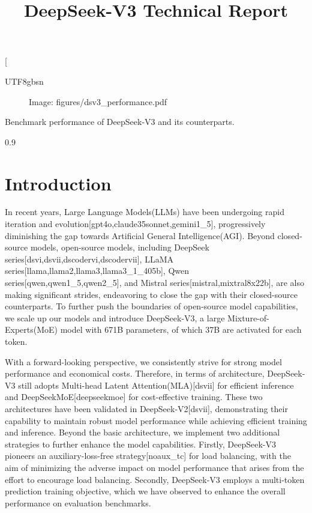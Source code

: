 \documentclass[11pt,a4paper]{article}
\title{DeepSeek-V3 Technical Report}
\begin{document}
\maketitle

[

UTF8gbsn

\begin{figure}[h]
\caption{Image: figures/dsv3\_performance.pdf}
\end{figure}

Benchmark performance of DeepSeek-V3 and its counterparts.

0.9

\section{Introduction}

In recent years, Large Language Models(LLMs) have been undergoing rapid iteration and evolution[gpt4o,claude35sonnet,gemini1\_5], progressively diminishing the gap towards Artificial General Intelligence(AGI).
Beyond closed-source models, open-source models, including DeepSeek series[dsvi,dsvii,dscodervi,dscodervii], LLaMA series[llama,llama2,llama3,llama3\_1\_405b], Qwen series[qwen,qwen1\_5,qwen2\_5], and Mistral series[mistral,mixtral8x22b], are also making significant strides, endeavoring to close the gap with their closed-source counterparts.
To further push the boundaries of open-source model capabilities, we scale up our models and introduce DeepSeek-V3, a large Mixture-of-Experts(MoE) model with 671B parameters, of which 37B are activated for each token.

With a forward-looking perspective, we consistently strive for strong model performance and economical costs.
Therefore, in terms of architecture, DeepSeek-V3 still adopts Multi-head Latent Attention(MLA)[dsvii] for efficient inference and DeepSeekMoE[deepseekmoe] for cost-effective training. 
These two architectures have been validated in DeepSeek-V2[dsvii], demonstrating their capability to maintain robust model performance while achieving efficient training and inference.
Beyond the basic architecture, we implement two additional strategies to further enhance the model capabilities. 
Firstly, DeepSeek-V3 pioneers an auxiliary-loss-free strategy[noaux\_tc] for load balancing, with the aim of minimizing the adverse impact on model performance that arises from the effort to encourage load balancing.
Secondly, DeepSeek-V3 employs a multi-token prediction training objective, which we have observed to enhance the overall performance on evaluation benchmarks.
\end{document}
